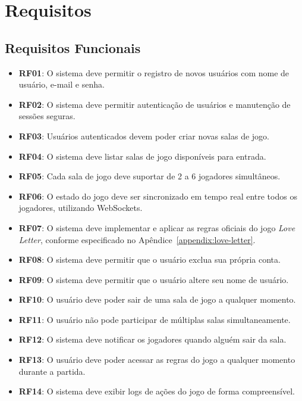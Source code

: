 \chapter{Requisitos}

\section{Requisitos Funcionais}

\begin{itemize}
    \item \textbf{RF01}: O sistema deve permitir o registro de novos usuários com nome de usuário, e-mail e senha.
    \item \textbf{RF02}: O sistema deve permitir autenticação de usuários e manutenção de sessões seguras.
    \item \textbf{RF03}: Usuários autenticados devem poder criar novas salas de jogo.
    \item \textbf{RF04}: O sistema deve listar salas de jogo disponíveis para entrada.
    \item \textbf{RF05}: Cada sala de jogo deve suportar de 2 a 6 jogadores simultâneos.
    \item \textbf{RF06}: O estado do jogo deve ser sincronizado em tempo real entre todos os jogadores, utilizando WebSockets.
    \item \textbf{RF07}: O sistema deve implementar e aplicar as regras oficiais do jogo \textit{Love Letter}, conforme especificado no Apêndice~\ref{appendix:love-letter}.
    \item \textbf{RF08}: O sistema deve permitir que o usuário exclua sua própria conta.
    \item \textbf{RF09}: O sistema deve permitir que o usuário altere seu nome de usuário.
    \item \textbf{RF10}: O usuário deve poder sair de uma sala de jogo a qualquer momento.
    \item \textbf{RF11}: O usuário não pode participar de múltiplas salas simultaneamente.
    \item \textbf{RF12}: O sistema deve notificar os jogadores quando alguém sair da sala.
    \item \textbf{RF13}: O usuário deve poder acessar as regras do jogo a qualquer momento durante a partida.
    \item \textbf{RF14}: O sistema deve exibir logs de ações do jogo de forma compreensível.
\end{itemize}

